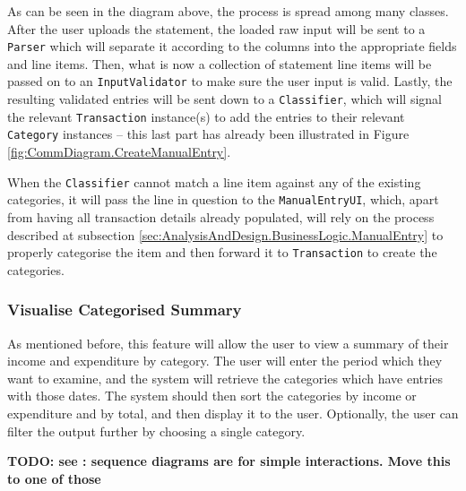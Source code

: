 As can be seen in the diagram above, the process is spread among many classes.
After the user uploads the statement, the loaded raw input will be sent to a
\texttt{Parser} which will separate it according to the columns into the
appropriate fields and line items. Then, what is now a collection of statement
line items will be passed on to an \texttt{InputValidator} to make sure the user
input is valid. Lastly, the resulting validated entries will be sent down to a
\texttt{Classifier}, which will signal the relevant \texttt{Transaction}
instance(s) to add the entries to their relevant \texttt{Category} instances --
this last part has already been illustrated in Figure
\ref{fig:CommDiagram.CreateManualEntry}. 

When the \texttt{Classifier} cannot match a line item against any of the existing
categories, it will pass the line in question to the \texttt{ManualEntryUI},
which, apart from having all transaction details already populated, will rely
on the process described at subsection \ref{sec:AnalysisAndDesign.BusinessLogic.ManualEntry}
to properly categorise the item and then forward it to \texttt{Transaction} to
create the categories.

\subsubsection{Visualise Categorised Summary} \label{sec:AnalysisAndDesign.BusinessLogic.ViewSummary}
As mentioned before, this feature will allow the user to view a summary of
their income and expenditure by category.  The user will enter the period which
they want to examine, and the system will retrieve the categories which have
entries with those dates.  The system should then sort the categories by income
or expenditure and by total, and then display it to the user. Optionally, the
user can filter the output further by choosing a single category.

\textbf{TODO: see \cite[][p.~262]{bennett2010object}: sequence diagrams are for simple
interactions. Move this to one of those}

